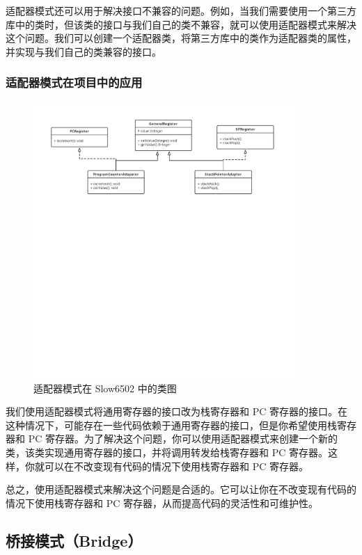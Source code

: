 \documentclass[cn,black,12pt,normal]{elegantnote}
\begin{document}
适配器模式还可以用于解决接口不兼容的问题。例如，当我们需要使用一个第三方库中的类时，但该类的接口与我们自己的类不兼容，就可以使用适配器模式来解决这个问题。我们可以创建一个适配器类，将第三方库中的类作为适配器类的属性，并实现与我们自己的类兼容的接口。

\subsubsection{适配器模式在项目中的应用}

\begin{figure}[H]
  \centering
  \includegraphics[width=0.9\textwidth]{figures/适配器模式.pdf}
  \caption{适配器模式在 Slow6502 中的类图}
\end{figure}

我们使用适配器模式将通用寄存器的接口改为栈寄存器和 PC 寄存器的接口。在这种情况下，可能存在一些代码依赖于通用寄存器的接口，但是你希望使用栈寄存器和 PC 寄存器。为了解决这个问题，你可以使用适配器模式来创建一个新的类，该类实现通用寄存器的接口，并将调用转发给栈寄存器和 PC 寄存器。这样，你就可以在不改变现有代码的情况下使用栈寄存器和 PC 寄存器。

总之，使用适配器模式来解决这个问题是合适的。它可以让你在不改变现有代码的情况下使用栈寄存器和 PC 寄存器，从而提高代码的灵活性和可维护性。


\subsection{桥接模式（Bridge）}
\end{document}
